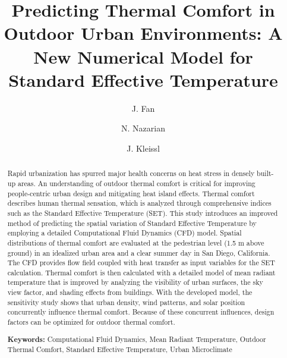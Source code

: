 \documentclass[preprint,3p,12pt,english]{elsarticle}
\begin{document}
\footskip=0.5in %
\begin{frontmatter}

\title{Predicting Thermal Comfort in Outdoor Urban Environments: A New Numerical Model for Standard Effective Temperature}

\author[rvt]{J. Fan }
\author[rvt]{N. Nazarian}
\author[rvt]{J. Kleissl}

\address[rvt]{Mechanical and Aerospace Engineering, University of California, San Diego, 9500 Gilman Dr. 0411, La Jolla, CA 92093-0411}



\begin{abstract}
Rapid urbanization has spurred major health concerns on heat stress in densely built-up areas. An understanding of outdoor thermal comfort is critical for improving people-centric urban design and mitigating heat island effects. Thermal comfort describes human thermal sensation, which is analyzed through comprehensive indices such as the Standard Effective Temperature (SET). This study introduces an improved method of predicting the spatial variation of Standard Effective Temperature by employing a detailed Computational Fluid Dynamics (CFD) model. Spatial distributions of thermal comfort are evaluated at the pedestrian level (1.5 m above ground) in an idealized urban area and a clear summer day in San Diego, California. The CFD provides flow field coupled with heat transfer as input variables for the SET calculation. Thermal comfort is then calculated with a detailed model of mean radiant temperature that is improved by analyzing the visibility of urban surfaces, the sky view factor, and shading effects from buildings. With the developed model, the sensitivity study shows that urban density, wind patterns, and solar position concurrently influence thermal comfort. Because of these concurrent influences, design factors can be optimized for outdoor thermal comfort. 


\textbf{Keywords:} Computational Fluid Dynamics, Mean Radiant Temperature, Outdoor Thermal Comfort, Standard Effective Temperature, Urban Microclimate 

\end{abstract}
\end{frontmatter}
\end{document}
